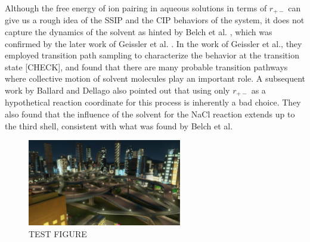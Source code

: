 \begin{spacing}{2.0}
    Although the free energy of ion pairing in aqueous solutions in terms of $r_{+-}$ can give us a rough idea of the SSIP and the CIP behaviors 
    of the system, it does not capture the dynamics of the solvent as hinted by Belch et al. \cite{P-JACS-1986-v108-Belch}, which was confirmed 
    by the later work of Geissler et al. \cite{P-JPhysChemB-1999-v103-Geissler}. In the work of Geissler et al., they employed transition path 
    sampling to characterize the behavior at the transition state [CHECK], and found that there are many probable transition pathways where 
    collective motion of solvent molecules play an important role. A subsequent work by Ballard and Dellago also pointed out that using only 
    $r_{+-}$ as a hypothetical reaction coordinate for this process is inherently a bad choice. \cite{P-JPhysChemB-2012-v116-Ballard} They also 
    found that the influence of the solvent for the NaCl reaction extends up to the third shell, consistent with what was found by Belch et al. 
    \cite{P-JACS-1986-v108-Belch}

    \begin{figure}[H]
        \centering
        \includegraphics[width=0.6\textwidth]{./figs/fig1-01}
        \caption{TEST FIGURE}
    \end{figure}

\end{spacing}
